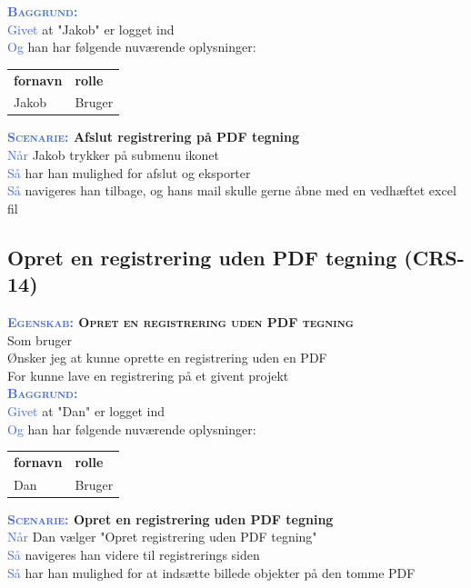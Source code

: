 \textsc{\textcolor{RoyalBlue}{\textbf{Baggrund:}}}\\
\textcolor{RoyalBlue}{Givet} at "Jakob" er logget ind\\
\textcolor{RoyalBlue}{Og} han har følgende nuværende oplysninger:\\
\begin{tabular}{| l | l |}
	\textbf{fornavn} & \textbf{rolle} \\
	Jakob & Bruger\\
\end{tabular}
\newline

\textbf{\textsc{\textcolor{RoyalBlue}{Scenarie:}} Afslut registrering på PDF tegning}\\
\textcolor{RoyalBlue}{Når} Jakob trykker på submenu ikonet\\
\textcolor{RoyalBlue}{Så}  har han mulighed for afslut og eksporter\\
\textcolor{RoyalBlue}{Så}  navigeres han tilbage, og hans mail skulle gerne åbne med en vedhæftet excel fil\\

\subsection{Opret en registrering uden PDF tegning (CRS-14)} \label{sec:USOpretRegUdenPDF}
\textbf{\textsc{\textcolor{RoyalBlue}{Egenskab:} Opret en registrering uden PDF tegning}}\\
Som bruger\\
Ønsker jeg at kunne oprette en registrering uden en PDF\\
For kunne lave en registrering på et givent projekt\\

\textsc{\textcolor{RoyalBlue}{\textbf{Baggrund:}}}\\
\textcolor{RoyalBlue}{Givet} at "Dan" er logget ind\\
\textcolor{RoyalBlue}{Og} han har følgende nuværende oplysninger:\\
\begin{tabular}{| l | l |}
	\textbf{fornavn} & \textbf{rolle} \\
	Dan & Bruger\\
\end{tabular}
\newline

\textbf{\textsc{\textcolor{RoyalBlue}{Scenarie:}} Opret en registrering uden PDF tegning}\\
\textcolor{RoyalBlue}{Når} Dan vælger "Opret registrering uden PDF tegning"\\
\textcolor{RoyalBlue}{Så} navigeres han videre til registrerings siden\\
\textcolor{RoyalBlue}{Så} har han mulighed for at indsætte billede objekter på den tomme PDF\\

